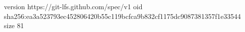 version https://git-lfs.github.com/spec/v1
oid sha256:ea3a523793ec452806420b55c119bcfca9b832cf1175dc9087381357f1e33544
size 81
